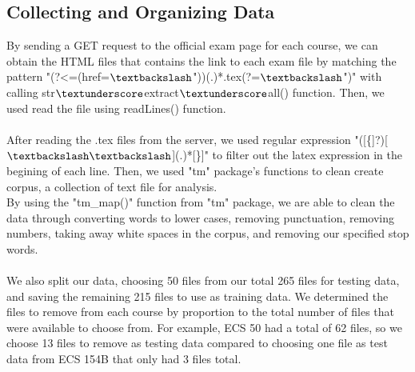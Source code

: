 \documentclass{article}
\begin{document}
    \subsection{Collecting and Organizing Data}
    By sending a GET request to the official exam page for each course, we can obtain the HTML files that contains  the link to each exam file by matching the pattern "(?<=(href=$\textbackslash$"))(.)*.tex(?=$\textbackslash$")" with calling str$\textunderscore$extract$\textunderscore$all() function. Then, we used read the file using readLines() function.
    \\\\
    After reading the .tex files from the server, we used regular expression "([\{]?)[$\textbackslash\textbackslash$](.)*[\}]" to filter out the latex expression in the begining of each line. Then, we used "tm" package's functions to clean create corpus, a collection of text file for analysis.\\
    By using the "tm\_map()" function from "tm" package, we are able to clean the data through converting words to lower cases, removing punctuation, removing numbers, taking away white spaces in the corpus, and removing our specified stop words.
    \\\\
    We also split our data, choosing 50 files from our total 265 files for testing data, and saving the remaining 215 files to use as training data. We determined the files to remove from each course by proportion to the total number of files that were available to choose from. For example, ECS 50 had a total of 62 files, so we choose 13 files to remove as testing data compared to choosing one file as test data from ECS 154B that only had 3 files total. 
    
\end{document}
